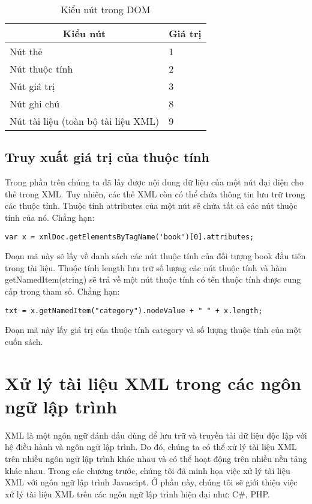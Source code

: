 \begin{center}
\begin{longtable}{|m{6cm}|m{2cm}|}
  \caption[Kiểu nút trong DOM]{Kiểu nút trong DOM}
   \endfirsthead
   \endhead
\hline
\multicolumn{1}{|c|}{ \textbf{Kiểu nút}}  &	\multicolumn{1}{c|}{ \textbf{Giá trị}}\\ \hline
  Nút thẻ  &	1 \\ \hline
  Nút thuộc tính  &	2\\ \hline
  Nút giá trị  &	3\\ \hline
  Nút ghi chú  &	8\\ \hline
  Nút tài liệu  (toàn bộ tài liệu XML)  & 	9\\ \hline

\end{longtable}
\end{center}
\vspace{-1cm}
\subsection{Truy xuất giá trị của thuộc tính}
Trong phần trên chúng ta đã lấy được nội dung dữ liệu của một nút đại diện cho thẻ trong XML. Tuy nhiên, các thẻ XML còn có thể chứa thông tin lưu trữ trong các thuộc tính. Thuộc tính {\ttfamily attributes} của một nút sẽ chứa tất cả các nút thuộc tính của nó. Chẳng hạn:
\lstset{language=XML}
\begin{lstlisting}[escapechar=`]
	var x = xmlDoc.getElementsByTagName('book')[0].attributes;
\end{lstlisting}

Đoạn mã này sẽ lấy về danh sách các nút thuộc tính của đối tượng book đầu tiên trong tài liệu. Thuộc tính {\ttfamily  length} lưu trữ số lượng các nút thuộc tính và hàm {\ttfamily  getNamedItem(string)} sẽ trả về một nút thuộc tính có tên thuộc tính được cung cấp trong tham số. Chẳng hạn:
\lstset{language=XML}
\begin{lstlisting}[escapechar=`]
	txt = x.getNamedItem("category").nodeValue + " " + x.length;
\end{lstlisting}

Đoạn mã này lấy giá trị của thuộc tính {\ttfamily  category} và số lượng thuộc tính của một cuốn sách.
\section{Xử lý tài liệu XML trong các ngôn ngữ lập trình}
XML là một ngôn ngữ đánh dấu dùng để lưu trữ và truyền tải dữ liệu độc lập với hệ điều hành và ngôn ngữ lập trình. Do đó, chúng ta có thể xử lý tài liệu XML trên nhiều ngôn ngữ lập trình khác nhau và có thể hoạt động trên nhiều nền tảng khác nhau. Trong các chương trước, chúng tôi đã minh họa việc xử lý tài liệu XML với ngôn ngữ lập trình Javascipt. Ở phần này, chúng tôi sẽ giới thiệu việc xử lý tài liệu XML trên các ngôn ngữ lập trình hiện đại như: C\#, PHP.

